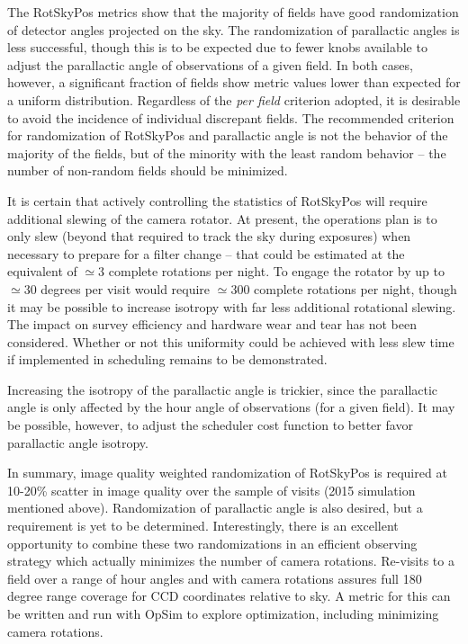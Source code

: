 The RotSkyPos metrics show that the majority of fields have good randomization
of detector angles projected on the sky.  The randomization of parallactic
angles is less successful, though this is to be expected due to fewer knobs
available to adjust the parallactic angle of observations of a given field.  In
both cases, however, a significant fraction of fields show metric values lower
than expected for a uniform distribution.  Regardless of the \emph{per field}
criterion adopted, it is desirable to avoid the incidence of individual
discrepant fields.  The recommended criterion for randomization of RotSkyPos and
parallactic angle is not the behavior of the majority of the fields, but of the
minority with the least random behavior -- the number of non-random fields
should be minimized.

It is certain that actively controlling the statistics of RotSkyPos will require
additional slewing of the camera rotator.  At present, the operations plan is to
only slew (beyond that required to track the sky during exposures) when
necessary to prepare for a filter change -- that could be estimated at the
equivalent of $\simeq 3$ complete rotations per night.  To engage the rotator by
up to $\simeq 30$ degrees per visit would require $\simeq 300$ complete
rotations per night, though it may be possible to increase isotropy with far
less additional rotational slewing.  The impact on survey efficiency and
hardware wear and tear has not been considered.  Whether or not this uniformity
could be achieved with less slew time if implemented in scheduling remains to be
demonstrated.

Increasing the isotropy of the parallactic angle is trickier, since the
parallactic angle is only affected by the hour angle of observations (for a
given field).  It may be possible, however, to adjust the scheduler cost
function to better favor parallactic angle isotropy.

In summary, image quality weighted randomization of RotSkyPos is required at
10-20\% scatter in image quality over the sample of visits (2015 simulation
mentioned above).  Randomization of parallactic angle is also desired, but a
requirement is yet to be determined.  Interestingly, there is an excellent
opportunity to combine these two randomizations in an efficient observing
strategy which actually minimizes the number of camera rotations.  Re-visits to
a field over a range of hour angles and with camera rotations assures full 180
degree range coverage for CCD coordinates relative to sky.  A metric for this
can be written and run with OpSim to explore optimization, including minimizing
camera rotations.

